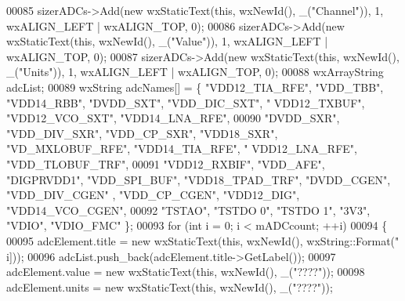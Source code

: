 \begin{DoxyCode}
00085     sizerADCs->Add(\textcolor{keyword}{new} wxStaticText(\textcolor{keyword}{this}, wxNewId(), \_(\textcolor{stringliteral}{"Channel"})), 1, wxALIGN\_LEFT | wxALIGN\_TOP, 0);
00086     sizerADCs->Add(\textcolor{keyword}{new} wxStaticText(\textcolor{keyword}{this}, wxNewId(), \_(\textcolor{stringliteral}{"Value"})), 1, wxALIGN\_LEFT | wxALIGN\_TOP, 0);
00087     sizerADCs->Add(\textcolor{keyword}{new} wxStaticText(\textcolor{keyword}{this}, wxNewId(), \_(\textcolor{stringliteral}{"Units"})), 1, wxALIGN\_LEFT | wxALIGN\_TOP, 0);
00088     wxArrayString adcList;
00089     wxString adcNames[] = \{ \textcolor{stringliteral}{"VDD12\_TIA\_RFE"}, \textcolor{stringliteral}{"VDD\_TBB"}, \textcolor{stringliteral}{"VDD14\_RBB"}, \textcolor{stringliteral}{"DVDD\_SXT"}, \textcolor{stringliteral}{"VDD\_DIC\_SXT"}, \textcolor{stringliteral}{"
      VDD12\_TXBUF"}, \textcolor{stringliteral}{"VDD12\_VCO\_SXT"}, \textcolor{stringliteral}{"VDD14\_LNA\_RFE"},
00090         \textcolor{stringliteral}{"DVDD\_SXR"}, \textcolor{stringliteral}{"VDD\_DIV\_SXR"}, \textcolor{stringliteral}{"VDD\_CP\_SXR"}, \textcolor{stringliteral}{"VDD18\_SXR"}, \textcolor{stringliteral}{"VD\_MXLOBUF\_RFE"}, \textcolor{stringliteral}{"VDD14\_TIA\_RFE"}, \textcolor{stringliteral}{"
      VDD12\_LNA\_RFE"}, \textcolor{stringliteral}{"VDD\_TLOBUF\_TRF"},
00091         \textcolor{stringliteral}{"VDD12\_RXBIF"}, \textcolor{stringliteral}{"VDD\_AFE"}, \textcolor{stringliteral}{"DIGPRVDD1"}, \textcolor{stringliteral}{"VDD\_SPI\_BUF"}, \textcolor{stringliteral}{"VDD18\_TPAD\_TRF"}, \textcolor{stringliteral}{"DVDD\_CGEN"}, \textcolor{stringliteral}{"VDD\_DIV\_CGEN"}
      , \textcolor{stringliteral}{"VDD\_CP\_CGEN"}, \textcolor{stringliteral}{"VDD12\_DIG"}, \textcolor{stringliteral}{"VDD14\_VCO\_CGEN"},
00092         \textcolor{stringliteral}{"TSTAO"}, \textcolor{stringliteral}{"TSTDO 0"}, \textcolor{stringliteral}{"TSTDO 1"}, \textcolor{stringliteral}{"3V3"}, \textcolor{stringliteral}{"VDIO"}, \textcolor{stringliteral}{"VDIO\_FMC"} \};
00093     \textcolor{keywordflow}{for} (\textcolor{keywordtype}{int} i = 0; i < mADCcount; ++i)
00094     \{
00095         adcElement.title = \textcolor{keyword}{new} wxStaticText(\textcolor{keyword}{this}, wxNewId(), wxString::Format(\textcolor{stringliteral}{"%
      i]));
00096         adcList.push\_back(adcElement.title->GetLabel());
00097         adcElement.value = \textcolor{keyword}{new} wxStaticText(\textcolor{keyword}{this}, wxNewId(), \_(\textcolor{stringliteral}{"????"}));
00098         adcElement.units = \textcolor{keyword}{new} wxStaticText(\textcolor{keyword}{this}, wxNewId(), \_(\textcolor{stringliteral}{"????"}));
}
\end{DoxyCode}
